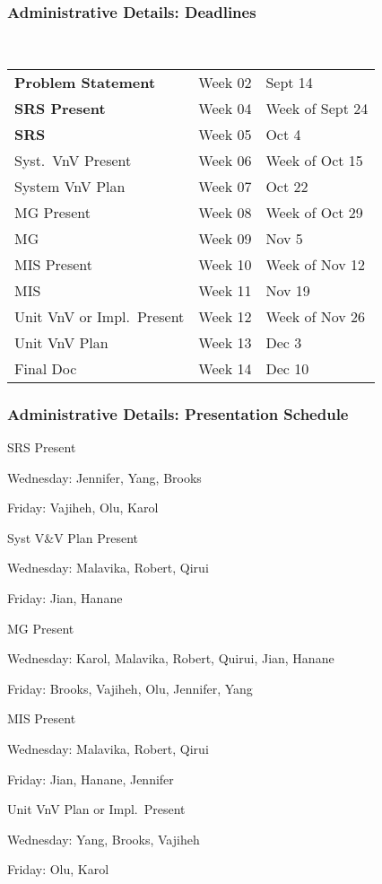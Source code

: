 \documentclass[t,12pt,numbers,fleqn]{beamer}
\begin{document}
\begin{frame}
\frametitle{Administrative Details: Deadlines}

~\newline
\begin{tabular}{l l l}
\textbf{Problem Statement} & Week 02 & Sept 14\\
\textbf{SRS Present} & Week 04 & Week of Sept 24\\
\textbf{SRS} & Week 05 & Oct 4\\
Syst.\ VnV Present & Week 06 & Week of Oct 15\\
System VnV Plan & Week 07 & Oct 22\\
MG Present & Week 08 & Week of Oct 29\\
MG & Week 09 & Nov 5\\
MIS Present & Week 10 & Week of Nov 12\\
MIS & Week 11 & Nov 19\\
Unit VnV or Impl.\ Present & Week 12 & Week of Nov 26\\
Unit VnV Plan & Week 13 & Dec 3\\
Final Doc & Week 14 & Dec 10\\
\end {tabular}

\end{frame}


\begin{frame}
\frametitle{Administrative Details: Presentation Schedule}

\bi
\item SRS Present
\bi
\item Wednesday: Jennifer, Yang, Brooks
\item Friday: Vajiheh, Olu, Karol
\ei
\item Syst V\&V Plan Present
\bi
\item Wednesday: Malavika, Robert, Qirui
\item Friday: Jian, Hanane
\ei
\item MG Present
\bi
\item Wednesday: Karol, Malavika, Robert, Quirui, Jian, Hanane
\item Friday: Brooks, Vajiheh, Olu, Jennifer, Yang
\ei
\item MIS Present
\bi
\item Wednesday: Malavika, Robert, Qirui
\item Friday: Jian, Hanane,  Jennifer
\ei
\item Unit VnV Plan or Impl.\ Present
\bi
\item Wednesday: Yang, Brooks, Vajiheh
\item Friday: Olu, Karol
\ei

\ei

\end{frame}
\end{document}
